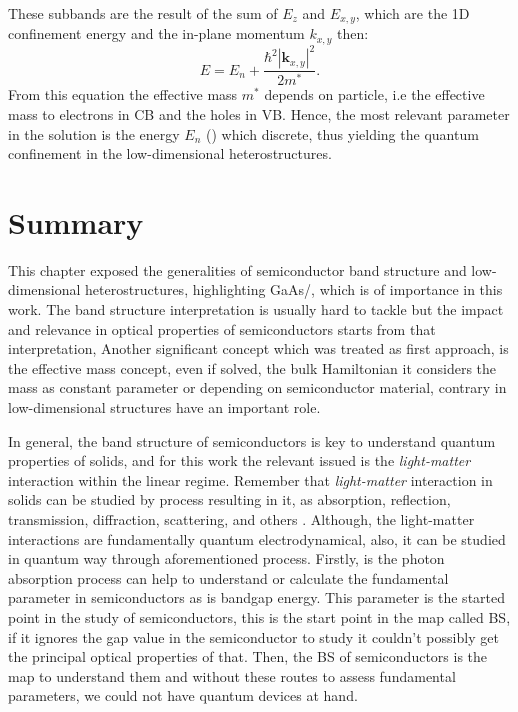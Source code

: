 These subbands are the result of the sum of $E_{z}$ and $E_{x,y}$, which are the 1D confinement energy and the in-plane momentum $k_{x,y}$ then\cite{harrison2016quantum}:
\begin{equation}\label{eqn:chapter-1-total-enery-ema-aprox}		
	E = E_{n} + \dfrac{\hbar^{2}|\boldsymbol{k}_{x,y}|^{2}}{2m^{*}}.
\end{equation}  
From this equation the effective mass  $m^*$ depends on particle, i.e the effective mass to electrons in CB and the holes in VB. Hence, the most relevant parameter in the solution is the energy $E_{n}$ () which discrete, thus yielding the quantum confinement in the low-dimensional
heterostructures.
\section{Summary}
\vspace{-10mm} 
This chapter exposed the generalities of semiconductor band structure and low-dimensional
heterostructures, highlighting GaAs/\algaas, which is of importance in this work. The band structure interpretation
is usually hard to tackle  but the impact and relevance in optical properties of semiconductors starts from that interpretation, Another significant concept which was treated as first approach, is the effective mass concept, even if solved, the bulk
Hamiltonian it considers the mass as constant parameter or depending on semiconductor
material, contrary in low-dimensional structures have an important role.

In general, the band structure of semiconductors is key to understand quantum
properties of solids, and for this work the relevant issued  is the \emph{light-matter} interaction within the linear regime. Remember that \emph{light-matter} interaction in solids can be studied by process resulting in it, as absorption,
reflection, transmission, diffraction, scattering, and others \cite{rivera2020light}. Although, the light-matter
interactions are fundamentally quantum electrodynamical, also, it can be studied in quantum
way through aforementioned process. Firstly, is the photon absorption process can help
to understand or calculate the fundamental parameter in semiconductors as is bandgap
energy. This parameter is the started point in the study of semiconductors, this is the start
point in the map called \gls{BS}, if it ignores the gap value in the semiconductor to
study it couldn't possibly get the principal optical properties of that.
Then, the \gls{BS} of semiconductors is the map to understand them and without these routes to assess fundamental
parameters, we could not have quantum devices at hand.
